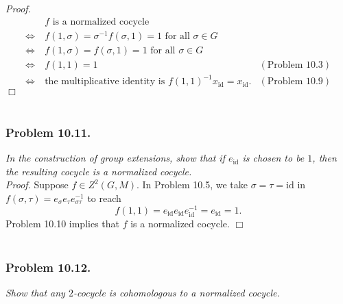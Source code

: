 \documentclass{article}
\begin{document}
\emph{Proof.}
  \begin{align*}
    & \: 
    \text{$f$ is a normalized cocycle} \\
    \Longleftrightarrow & \:
    \text{$f(1,\sigma) = \sigma^{-1}f(\sigma,1) = 1$ for all $\sigma \in G$} \\
    \Longleftrightarrow & \:
    \text{$f(1,\sigma) = f(\sigma,1) = 1$ for all $\sigma \in G$} \\
    \Longleftrightarrow & \:
    \text{$f(1,1) = 1$}
      &(\text{Problem 10.3}) \\
    \Longleftrightarrow & \:
    \text{the multiplicative identity is $f(1,1)^{-1}x_{\mathrm{id}} = x_{\mathrm{id}}$}.
      &(\text{Problem 10.9})
  \end{align*}
$\Box$ \\\\






\subsubsection*{Problem 10.11.}
\emph{In the construction of group extensions,
show that if $e_{\mathrm{id}}$ is chosen to be $1$,
then the resulting cocycle is a normalized cocycle.} \\



\emph{Proof.}
  Suppose $f \in Z^2(G,M)$.
  In Problem 10.5,
  we take $\sigma = \tau = \mathrm{id}$ in
  $f(\sigma,\tau) = e_{\sigma}e_{\tau}e_{\sigma\tau}^{-1}$ to reach
  \[
    f(1,1)
    = e_{\mathrm{id}}e_{\mathrm{id}}e_{\mathrm{id}}^{-1}
    = e_{\mathrm{id}}
    = 1.
  \]
  Problem 10.10 implies that $f$ is a normalized cocycle.
$\Box$ \\\\






\subsubsection*{Problem 10.12.}
\emph{Show that any $2$-cocycle is cohomologous to a normalized cocycle.} \\
\end{document}
